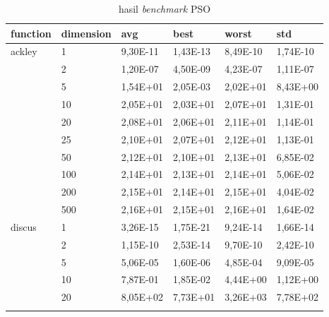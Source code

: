 \begin{longtable}[c]{|p{3.5cm}|l|l|l|l|l|}
\caption{hasil \textit{benchmark} PSO}
\label{tab:pso-result}\\
\hline
function                               & dimension & avg      & best     & worst    & std      \\ \hline
\endfirsthead
%
\endhead
%
\multirow[t]{10}{*}{ackley}               & 1         & 9,30E-11 & 1,43E-13 & 8,49E-10 & 1,74E-10 \\ \cline{2-6} 
                                       & 2         & 1,20E-07 & 4,50E-09 & 4,23E-07 & 1,11E-07 \\ \cline{2-6} 
                                       & 5         & 1,54E+01 & 2,05E-03 & 2,02E+01 & 8,43E+00 \\ \cline{2-6} 
                                       & 10        & 2,05E+01 & 2,03E+01 & 2,07E+01 & 1,31E-01 \\ \cline{2-6} 
                                       & 20        & 2,08E+01 & 2,06E+01 & 2,11E+01 & 1,14E-01 \\ \cline{2-6} 
                                       & 25        & 2,10E+01 & 2,07E+01 & 2,12E+01 & 1,13E-01 \\ \cline{2-6} 
                                       & 50        & 2,12E+01 & 2,10E+01 & 2,13E+01 & 6,85E-02 \\ \cline{2-6} 
                                       & 100       & 2,14E+01 & 2,13E+01 & 2,14E+01 & 5,06E-02 \\ \cline{2-6} 
                                       & 200       & 2,15E+01 & 2,14E+01 & 2,15E+01 & 4,04E-02 \\ \cline{2-6} 
                                       & 500       & 2,16E+01 & 2,15E+01 & 2,16E+01 & 1,64E-02 \\ \hline
\multirow[t]{10}{*}{discus}               & 1         & 3,26E-15 & 1,75E-21 & 9,24E-14 & 1,66E-14 \\ \cline{2-6} 
                                       & 2         & 1,15E-10 & 2,53E-14 & 9,70E-10 & 2,42E-10 \\ \cline{2-6} 
                                       & 5         & 5,06E-05 & 1,60E-06 & 4,85E-04 & 9,09E-05 \\ \cline{2-6} 
                                       & 10        & 7,87E-01 & 1,85E-02 & 4,44E+00 & 1,12E+00 \\ \cline{2-6} 
                                       & 20        & 8,05E+02 & 7,73E+01 & 3,26E+03 & 7,78E+02 \\ \cline{2-6} 

\end{longtable}
